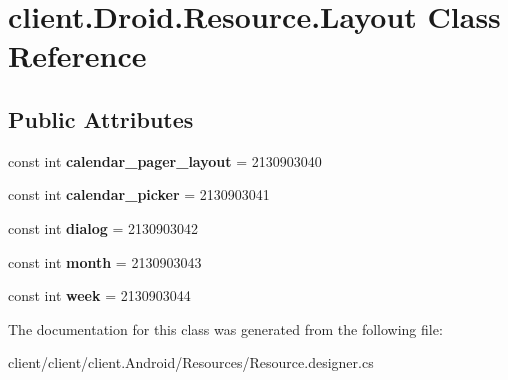 \hypertarget{classclient_1_1Droid_1_1Resource_1_1Layout}{\section{client.\-Droid.\-Resource.\-Layout Class Reference}
\label{classclient_1_1Droid_1_1Resource_1_1Layout}
}
\subsection*{Public Attributes}
\begin{DoxyCompactItemize}
\item 
\hypertarget{classclient_1_1Droid_1_1Resource_1_1Layout_af8fc52c3022e4e69f71edb40b1a87aa7}{const int {\bfseries calendar\-\_\-pager\-\_\-layout} = 2130903040}\label{classclient_1_1Droid_1_1Resource_1_1Layout_af8fc52c3022e4e69f71edb40b1a87aa7}

\item 
\hypertarget{classclient_1_1Droid_1_1Resource_1_1Layout_ac1eb8be0fd7c4eb03580600fe48793c4}{const int {\bfseries calendar\-\_\-picker} = 2130903041}\label{classclient_1_1Droid_1_1Resource_1_1Layout_ac1eb8be0fd7c4eb03580600fe48793c4}

\item 
\hypertarget{classclient_1_1Droid_1_1Resource_1_1Layout_a34cd4a30c8460217cdf0f25e4198daf1}{const int {\bfseries dialog} = 2130903042}\label{classclient_1_1Droid_1_1Resource_1_1Layout_a34cd4a30c8460217cdf0f25e4198daf1}

\item 
\hypertarget{classclient_1_1Droid_1_1Resource_1_1Layout_ae2c17f1d0e71a936b9fa5ee33685ffe7}{const int {\bfseries month} = 2130903043}\label{classclient_1_1Droid_1_1Resource_1_1Layout_ae2c17f1d0e71a936b9fa5ee33685ffe7}

\item 
\hypertarget{classclient_1_1Droid_1_1Resource_1_1Layout_afebfc2611ecc130e8eaa7b227d0c97f3}{const int {\bfseries week} = 2130903044}\label{classclient_1_1Droid_1_1Resource_1_1Layout_afebfc2611ecc130e8eaa7b227d0c97f3}

\end{DoxyCompactItemize}


The documentation for this class was generated from the following file\-:\begin{DoxyCompactItemize}
\item 
client/client/client.\-Android/\-Resources/Resource.\-designer.\-cs\end{DoxyCompactItemize}

